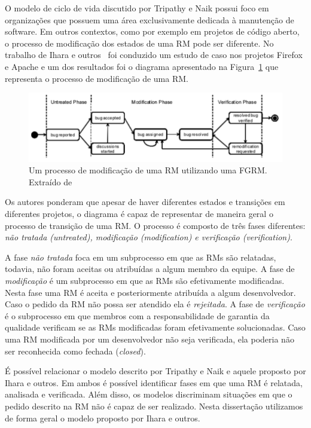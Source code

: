 O modelo de ciclo de vida discutido por Tripathy e Naik possui foco em
organizações que possuem uma área exclusivamente dedicada à manutenção de
software. Em outros contextos, como por exemplo em projetos de código aberto, o
processo de modificação dos estados de uma RM pode ser diferente. No trabalho de
Ihara e outros~\cite{ihara2009analysis} foi conduzido um estudo de caso nos
projetos Firefox e Apache e um dos resultados foi o diagrama apresentado na
Figura~\ref{fig:diagrama-estado-rm-codigo-aberto} que representa o processo de
modificação de uma RM\@.

\begin{figure}[htpb]
	\centering
    \includegraphics[width=0.8\linewidth]{./chapter-manutencao-software-visao-geral/img/diagrama-estado-rm-codigo-aberto.pdf}
    \caption{Um processo de modificação de uma RM utilizando uma FGRM\@.
        Extraído de~\cite{ihara2009analysis}}\label{fig:diagrama-estado-rm-codigo-aberto}
\end{figure}

Os autores ponderam que apesar de haver diferentes estados e transições em
diferentes projetos, o diagrama é capaz de representar de maneira geral o
processo de transição de uma RM\@. O processo é composto de três fases
diferentes: \textit{não tratada (untreated), modificação (modification) e
    verificação (verification)}.

A fase \textit{não tratada} foca em um subprocesso em que as RMs são relatadas,
todavia, não foram aceitas ou atribuídas a algum membro da equipe. A fase de
\textit{modificação} é um subprocesso em que as RMs são efetivamente
modificadas. Nesta fase uma RM é aceita e posteriormente atribuída a algum
desenvolvedor. Caso o pedido da RM não possa ser atendido ela é
\textit{rejeitada}. A fase de \textit{verificação} é o subprocesso em que
membros com a responsabilidade de garantia da qualidade verificam se as RMs
modificadas foram efetivamente solucionadas. Caso uma RM modificada por um
desenvolvedor não seja verificada, ela poderia não ser reconhecida como fechada
(\textit{closed}).

É possível relacionar o modelo descrito por Tripathy e Naik e aquele proposto
por Ihara e outros. Em ambos é possível identificar fases em que uma RM é
relatada, analisada e verificada. Além disso, os modelos discriminam situações
em que o pedido descrito na RM não é capaz de ser realizado. Nesta dissertação
utilizamos de forma geral o modelo proposto por Ihara e outros.

